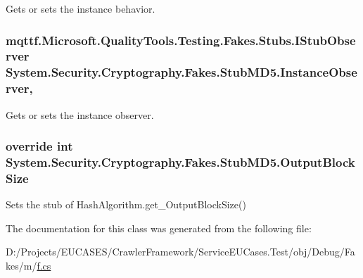 Gets or sets the instance behavior.

\hypertarget{class_system_1_1_security_1_1_cryptography_1_1_fakes_1_1_stub_m_d5_a934296dd9265c6975c9066a0f03ef996}{
\subsubsection[{Instance\-Observer}]{\setlength{\rightskip}{0pt plus 5cm}mqttf.\-Microsoft.\-Quality\-Tools.\-Testing.\-Fakes.\-Stubs.\-I\-Stub\-Observer System.\-Security.\-Cryptography.\-Fakes.\-Stub\-M\-D5.\-Instance\-Observer\hspace{0.3cm}{\ttfamily [get]}, {\ttfamily [set]}}}\label{class_system_1_1_security_1_1_cryptography_1_1_fakes_1_1_stub_m_d5_a934296dd9265c6975c9066a0f03ef996}


Gets or sets the instance observer.

\hypertarget{class_system_1_1_security_1_1_cryptography_1_1_fakes_1_1_stub_m_d5_a4cddce36def6487ba96a90e9b1c094e2}{
\subsubsection[{Output\-Block\-Size}]{\setlength{\rightskip}{0pt plus 5cm}override int System.\-Security.\-Cryptography.\-Fakes.\-Stub\-M\-D5.\-Output\-Block\-Size\hspace{0.3cm}{\ttfamily [get]}}}\label{class_system_1_1_security_1_1_cryptography_1_1_fakes_1_1_stub_m_d5_a4cddce36def6487ba96a90e9b1c094e2}


Sets the stub of Hash\-Algorithm.\-get\-\_\-\-Output\-Block\-Size()



The documentation for this class was generated from the following file\-:\begin{DoxyCompactItemize}
\item 
D\-:/\-Projects/\-E\-U\-C\-A\-S\-E\-S/\-Crawler\-Framework/\-Service\-E\-U\-Cases.\-Test/obj/\-Debug/\-Fakes/m/\hyperlink{m_2f_8cs}{f.\-cs}\end{DoxyCompactItemize}
